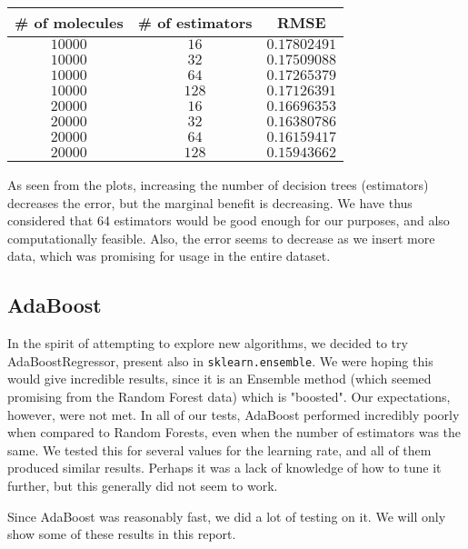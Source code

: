\documentclass[10pt]{article}
\begin{document}
\medskip

\begin{center}

\begin{tabular}[center]{|c|c|c|}
\hline
\# of molecules & \# of estimators & RMSE \\
\hline
$10000$ & $16$ & $0.17802491$ \\
\hline 
$10000$ & $32$ & $0.17509088$ \\
\hline 
$10000$ & $64$ & $0.17265379$ \\
\hline
$10000$ & $128$ & $0.17126391$ \\
\hline
$20000$ & $16$ & $0.16696353$ \\
\hline 
$20000$ & $32$ & $0.16380786$ \\
\hline 
$20000$ & $64$ & $0.16159417$ \\
\hline
$20000$ & $128$ & $0.15943662$ \\
\hline
\end{tabular}

\end{center}

\medskip

As seen from the plots, increasing the number of decision trees (estimators)
decreases the error, but the marginal benefit is decreasing. We have thus
considered that 64 estimators would be good enough for our purposes,
and also computationally feasible. Also, the error seems to decrease as we
insert more data, which was promising for usage in the entire dataset.

\subsection{AdaBoost}

In the spirit of attempting to explore new algorithms, we decided to try
AdaBoostRegressor, present also in \verb|sklearn.ensemble|. We were hoping
this would give incredible results, since it is an Ensemble method (which
seemed promising from the Random Forest data) which is "boosted". Our expectations,
however, were not met. In all of our tests, AdaBoost performed incredibly poorly
when compared to Random Forests, even when the number of estimators was the same.
We tested this for several values for the learning rate, and all of them
produced similar results. Perhaps it was a lack of knowledge of how to tune
it further, but this generally did not seem to work.

\medskip

Since AdaBoost was reasonably fast, we did a lot of testing on it. We will
only show some of these results in this report.
\end{document}

